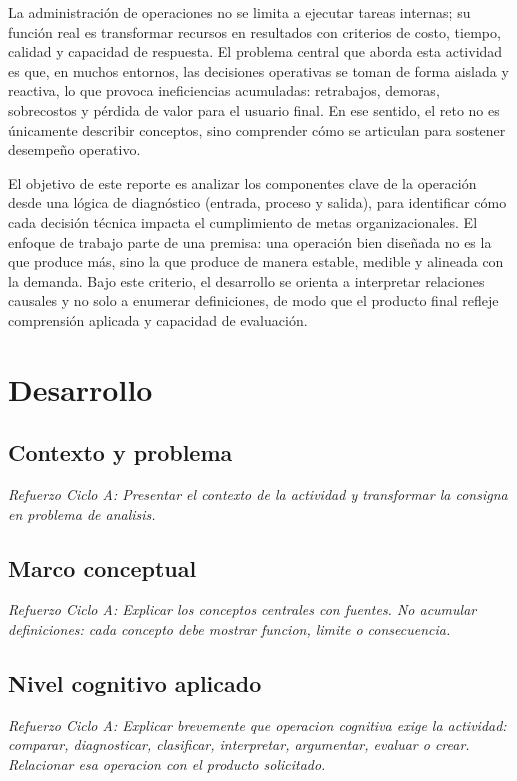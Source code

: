 \documentclass[
	spanish,
	letterpaper, oneside
]{article}
\begin{document}
La administración de operaciones no se limita a ejecutar tareas internas; su función real es transformar recursos en resultados con criterios de costo, tiempo, calidad y capacidad de respuesta. El problema central que aborda esta actividad es que, en muchos entornos, las decisiones operativas se toman de forma aislada y reactiva, lo que provoca ineficiencias acumuladas: retrabajos, demoras, sobrecostos y pérdida de valor para el usuario final. En ese sentido, el reto no es únicamente describir conceptos, sino comprender cómo se articulan para sostener desempeño operativo.

El objetivo de este reporte es analizar los componentes clave de la operación desde una lógica de diagnóstico (entrada, proceso y salida), para identificar cómo cada decisión técnica impacta el cumplimiento de metas organizacionales. El enfoque de trabajo parte de una premisa: una operación bien diseñada no es la que produce más, sino la que produce de manera estable, medible y alineada con la demanda. Bajo este criterio, el desarrollo se orienta a interpretar relaciones causales y no solo a enumerar definiciones, de modo que el producto final refleje comprensión aplicada y capacidad de evaluación.

\section{Desarrollo}

\subsection{Contexto y problema}

\textit{Refuerzo Ciclo A: Presentar el contexto de la actividad y transformar la consigna en problema de analisis.}

\subsection{Marco conceptual}

\textit{Refuerzo Ciclo A: Explicar los conceptos centrales con fuentes. No acumular definiciones: cada concepto debe mostrar funcion, limite o consecuencia.}

\subsection{Nivel cognitivo aplicado}

\textit{Refuerzo Ciclo A: Explicar brevemente que operacion cognitiva exige la actividad: comparar, diagnosticar, clasificar, interpretar, argumentar, evaluar o crear. Relacionar esa operacion con el producto solicitado.}
\end{document}
